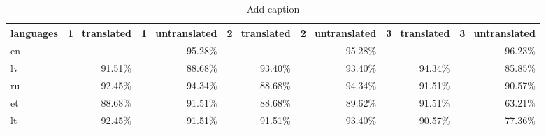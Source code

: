 \begin{table}[htbp]
  \centering
  \caption{Add caption}
    \begin{tabular}{lrrrrrr} \toprule
    languages & 1\_translated & 1\_untranslated & 2\_translated & 2\_untranslated & 3\_translated & 3\_untranslated \\\midrule
    en    &       & \cellcolor[rgb]{ .482,  .631,  .824}95.28\% &       & \cellcolor[rgb]{ .482,  .631,  .824}95.28\% &       & \cellcolor[rgb]{ .353,  .541,  .776}96.23\% \\
    lv    & \cellcolor[rgb]{ .988,  .988,  1}91.51\% & \cellcolor[rgb]{ .984,  .929,  .941}88.68\% & \cellcolor[rgb]{ .737,  .812,  .914}93.40\% & \cellcolor[rgb]{ .737,  .812,  .914}93.40\% & \cellcolor[rgb]{ .608,  .722,  .867}94.34\% & \cellcolor[rgb]{ .984,  .871,  .882}85.85\% \\
    ru    & \cellcolor[rgb]{ .863,  .902,  .957}92.45\% & \cellcolor[rgb]{ .608,  .722,  .867}94.34\% & \cellcolor[rgb]{ .984,  .929,  .941}88.68\% & \cellcolor[rgb]{ .608,  .722,  .867}94.34\% & \cellcolor[rgb]{ .988,  .988,  1}91.51\% & \cellcolor[rgb]{ .984,  .969,  .98}90.57\% \\
    et    & \cellcolor[rgb]{ .984,  .929,  .941}88.68\% & \cellcolor[rgb]{ .988,  .988,  1}91.51\% & \cellcolor[rgb]{ .984,  .929,  .941}88.68\% & \cellcolor[rgb]{ .984,  .949,  .961}89.62\% & \cellcolor[rgb]{ .988,  .988,  1}91.51\% & \cellcolor[rgb]{ .973,  .412,  .42}63.21\% \\
    lt    & \cellcolor[rgb]{ .863,  .902,  .957}92.45\% & \cellcolor[rgb]{ .988,  .988,  1}91.51\% & \cellcolor[rgb]{ .988,  .988,  1}91.51\% & \cellcolor[rgb]{ .737,  .812,  .914}93.40\% & \cellcolor[rgb]{ .984,  .969,  .98}90.57\% & \cellcolor[rgb]{ .98,  .698,  .71}77.36\% \\\bottomrule
    \end{tabular}%
  \label{tab:chatbot-xlm}%
\end{table}%




